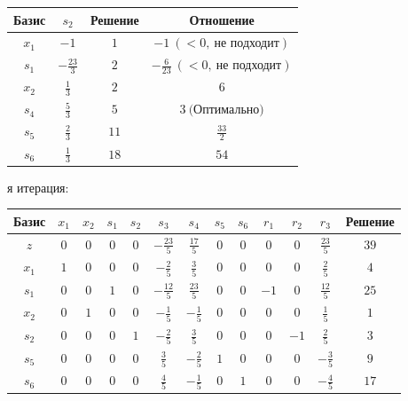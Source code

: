 \documentclass{article}%
\begin{document}
\begin{flushleft}
\begin{tabular}{|c|ccccccccccc|c|}
\hline%
\end{tabular}%
\newline%
\newline%
\newline%
\begin{tabular}{|cccc|}%
\hline%
Базис&$s_{2}$&Решение&Отношение\\%
\hline%
$x_{1}$&$-1$&$1$&$-1\: (< 0, \: \text{не подходит})$\\%
$s_{1}$&$-\frac{23}{3}$&$2$&$-\frac{6}{23}\: (< 0, \: \text{не подходит})$\\%
$x_{2}$&$\frac{1}{3}$&$2$&$6$\\%
$s_{4}$&$\frac{5}{3}$&$5$&$3\: \text{(Оптимально)}$\\%
$s_{5}$&$\frac{2}{3}$&$11$&$\frac{33}{2}$\\%
$s_{6}$&$\frac{1}{3}$&$18$&$54$\\%
\hline%
\end{tabular}%
\newline%
\newline%
я итерация: %
\newline%
\newline%
\renewcommand{\arraystretch}{1.3}%
\begin{tabular}{|c|ccccccccccc|c|}%
\hline%
Базис&$x_{1}$&$x_{2}$&$s_{1}$&$s_{2}$&$s_{3}$&$s_{4}$&$s_{5}$&$s_{6}$&$r_{1}$&$r_{2}$&$r_{3}$&Решение\\%
\hline%
$z$&$0$&$0$&$0$&$0$&$-\frac{23}{5}$&$\frac{17}{5}$&$0$&$0$&$0$&$0$&$\frac{23}{5}$&$39$\\%
\hline%
$x_{1}$&$1$&$0$&$0$&$0$&$-\frac{2}{5}$&$\frac{3}{5}$&$0$&$0$&$0$&$0$&$\frac{2}{5}$&$4$\\%
$s_{1}$&$0$&$0$&$1$&$0$&$-\frac{12}{5}$&$\frac{23}{5}$&$0$&$0$&$-1$&$0$&$\frac{12}{5}$&$25$\\%
$x_{2}$&$0$&$1$&$0$&$0$&$-\frac{1}{5}$&$-\frac{1}{5}$&$0$&$0$&$0$&$0$&$\frac{1}{5}$&$1$\\%
$s_{2}$&$0$&$0$&$0$&$1$&$-\frac{2}{5}$&$\frac{3}{5}$&$0$&$0$&$0$&$-1$&$\frac{2}{5}$&$3$\\%
$s_{5}$&$0$&$0$&$0$&$0$&$\frac{3}{5}$&$-\frac{2}{5}$&$1$&$0$&$0$&$0$&$-\frac{3}{5}$&$9$\\%
$s_{6}$&$0$&$0$&$0$&$0$&$\frac{4}{5}$&$-\frac{1}{5}$&$0$&$1$&$0$&$0$&$-\frac{4}{5}$&$17$\\%
\hline%
\end{tabular}%
\newline%
\newline%

\end{flushleft}
\end{document}
